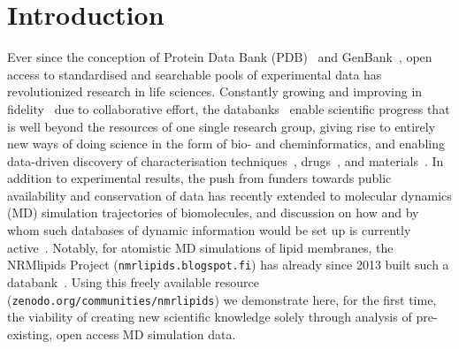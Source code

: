 \documentclass[journal=jpcbfk,manuscript=article,layout=twocolumn]{achemso}
\begin{document}
\section{Introduction}
Ever since the conception of Protein Data Bank (PDB)~\cite{nnb1971,wwPDB2019} and GenBank~\cite{jordan1982,sayers2020},
open access to standardised and searchable pools of experimental data has
revolutionized
research in life sciences.
Constantly growing and improving in fidelity~\cite{hobohm1992,levitt2007,meszaros2019}
due to collaborative effort, the databanks~\cite{Gaber:2019a} enable scientific progress that is well beyond the resources of one single research group, giving rise to entirely new ways of doing science in the form of bio- and cheminformatics, and enabling data-driven discovery of 
characterisation techniques~\cite{burley2018}, %
drugs~\cite{kirchmair08}, and materials~\cite{huang2016}.
%
%
In addition to experimental results, the push from %
funders towards public availability and conservation of data has recently extended to molecular dynamics (MD) simulation trajectories of biomolecules, and discussion on how and by whom such databases of dynamic information would be set up is currently active~\cite{Hildebrand:2019a,Abraham:2019a,Gygli:2020a,Abriata:2020a,Hospital:2020a}.
%
Notably, for atomistic MD simulations of lipid membranes,
the NRMlipids Project ({\tt nmrlipids.blogspot.fi}) has already since 2013 built such a databank~\cite{Miettinen:2019c}.
Using this freely available resource
({\tt zenodo.org/communities/nmrlipids})
we demonstrate here, for the first time, the viability of creating new scientific knowledge solely through analysis of pre-existing, open access MD simulation data.
\end{document}
